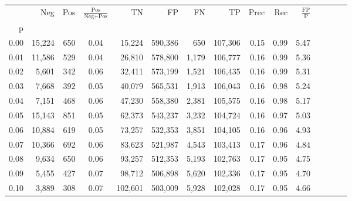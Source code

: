 \begin{tabular}{rrrcrrrrrrrrrrr}
\toprule
{} &     Neg &    Pos & $\frac{\text{Pos}}{\text{Neg}+\text{Pos}}$ &       TN &       FP &       FN &       TP &  Prec &   Rec & $\frac{\text{FP}}{\text{P}}$ \\
p    &         &        &                                            &          &          &          &          &       &       &                              \\
\midrule
0.00 &  15,224 &    650 &                                       0.04 &   15,224 &  590,386 &      650 &  107,306 &  0.15 &  0.99 &                         5.47 \\
0.01 &  11,586 &    529 &                                       0.04 &   26,810 &  578,800 &    1,179 &  106,777 &  0.16 &  0.99 &                         5.36 \\
0.02 &   5,601 &    342 &                                       0.06 &   32,411 &  573,199 &    1,521 &  106,435 &  0.16 &  0.99 &                         5.31 \\
0.03 &   7,668 &    392 &                                       0.05 &   40,079 &  565,531 &    1,913 &  106,043 &  0.16 &  0.98 &                         5.24 \\
0.04 &   7,151 &    468 &                                       0.06 &   47,230 &  558,380 &    2,381 &  105,575 &  0.16 &  0.98 &                         5.17 \\
0.05 &  15,143 &    851 &                                       0.05 &   62,373 &  543,237 &    3,232 &  104,724 &  0.16 &  0.97 &                         5.03 \\
0.06 &  10,884 &    619 &                                       0.05 &   73,257 &  532,353 &    3,851 &  104,105 &  0.16 &  0.96 &                         4.93 \\
0.07 &  10,366 &    692 &                                       0.06 &   83,623 &  521,987 &    4,543 &  103,413 &  0.17 &  0.96 &                         4.84 \\
0.08 &   9,634 &    650 &                                       0.06 &   93,257 &  512,353 &    5,193 &  102,763 &  0.17 &  0.95 &                         4.75 \\
0.09 &   5,455 &    427 &                                       0.07 &   98,712 &  506,898 &    5,620 &  102,336 &  0.17 &  0.95 &                         4.70 \\
0.10 &   3,889 &    308 &                                       0.07 &  102,601 &  503,009 &    5,928 &  102,028 &  0.17 &  0.95 &                         4.66 \\

\end{tabular}
